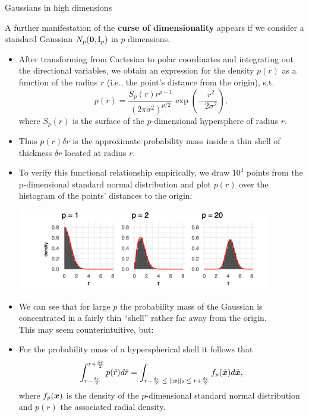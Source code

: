 \begin{vbframe}{Gaussians in high dimensions}

A further manifestation of the \textbf{curse of dimensionality} appears if we consider a standard Gaussian $N_p(\bm{0}, \mathrm{I}_p)$ in $p$ dimensions.

\begin{itemize}
    \item After transforming from Cartesian to polar coordinates and integrating out the directional variables, we obtain an expression for the density $p(r)$ as a function of the radius $r$ (i.e., the point's distance from the origin), s.t.
    $$ p(r) = \frac{S_p(r)r^{p-1}}{(2 \pi \sigma^2)^{p/2}} \exp \left( -\frac{r^2}{2\sigma^2}\right),$$
    where $S_p(r)$ is the surface of the $p$-dimensional hypersphere of radius $r$.
    \item Thus $p(r) \delta r$ is the approximate probability mass inside a thin shell of thickness $\delta r$ located at radius $r$. 
    
  
\framebreak 
\item To verify this functional relationship empirically, we draw $10^4$ points from the p-dimensional standard normal distribution and plot $p(r)$ over the histogram of the points' distances to the origin:

\begin{center}
\includegraphics[width = 11cm ]{figure_man/histograms.png}
\end{center}

\item We can see that for large $p$ the probability mass of the Gaussian is concentrated in a fairly thin \enquote{shell} rather far away from the origin. \\
This may seem counterintuitive, but:

\framebreak

  \item For the probability mass of a hyperspherical shell it follows that
    $$\int^{r + \frac{\delta r}{2}}_{r - \frac{\delta r}{2}}p(\tilde{r})d\tilde{r} = \int_{r - \frac{\delta r}{2} \; \leq \; ||\bm{x}||_2 \; \leq \; r + \frac{\delta r}{2}} f_p(\tilde{\bm{x}}) d\tilde{\bm{x}},$$
    where $f_p(\bm{x})$ is the density of the $p$-dimensional standard normal distribution and $p(r)$ the associated radial density.


\end{itemize}
\end{vbframe}
